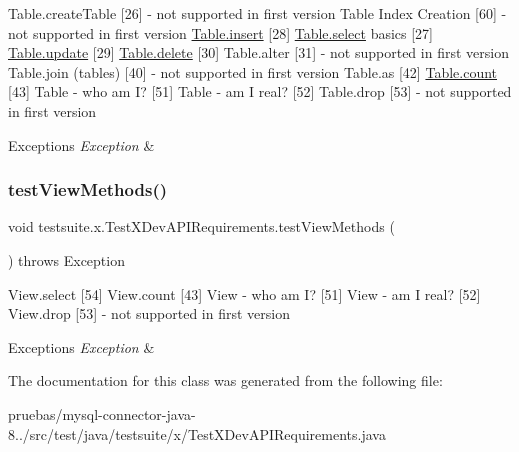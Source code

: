 Table.\+create\+Table \mbox{[}26\mbox{]} -\/ not supported in first version Table Index Creation \mbox{[}60\mbox{]} -\/ not supported in first version \mbox{\hyperlink{interfacecom_1_1mysql_1_1cj_1_1xdevapi_1_1_table_ae9faedd85539146509fa68982fc346f9}{Table.\+insert}} \mbox{[}28\mbox{]} \mbox{\hyperlink{interfacecom_1_1mysql_1_1cj_1_1xdevapi_1_1_table_a36559f114d9638a63d8743f1f1630017}{Table.\+select}} basics \mbox{[}27\mbox{]} \mbox{\hyperlink{interfacecom_1_1mysql_1_1cj_1_1xdevapi_1_1_table_a941215cefeb7236388db7d0390621a17}{Table.\+update}} \mbox{[}29\mbox{]} \mbox{\hyperlink{interfacecom_1_1mysql_1_1cj_1_1xdevapi_1_1_table_a52be4284a88e0a4f243580be570018e2}{Table.\+delete}} \mbox{[}30\mbox{]} Table.\+alter \mbox{[}31\mbox{]} -\/ not supported in first version Table.\+join (tables) \mbox{[}40\mbox{]} -\/ not supported in first version Table.\+as \mbox{[}42\mbox{]} \mbox{\hyperlink{interfacecom_1_1mysql_1_1cj_1_1xdevapi_1_1_table_a4f0524bd76d54d6b053187ea09ab2956}{Table.\+count}} \mbox{[}43\mbox{]} Table -\/ who am I? \mbox{[}51\mbox{]} Table -\/ am I real? \mbox{[}52\mbox{]} Table.\+drop \mbox{[}53\mbox{]} -\/ not supported in first version


\begin{DoxyExceptions}{Exceptions}
{\em Exception} & \\
\hline
\end{DoxyExceptions}
\mbox{\label{classtestsuite_1_1x_1_1_test_x_dev_a_p_i_requirements_abe35866f814afea6ea1f17133b93d9de}} 
\subsubsection{\texorpdfstring{test\+View\+Methods()}{testViewMethods()}}
{\footnotesize\ttfamily void testsuite.\+x.\+Test\+X\+Dev\+A\+P\+I\+Requirements.\+test\+View\+Methods (\begin{DoxyParamCaption}{ }\end{DoxyParamCaption}) throws Exception}

View.\+select \mbox{[}54\mbox{]} View.\+count \mbox{[}43\mbox{]} View -\/ who am I? \mbox{[}51\mbox{]} View -\/ am I real? \mbox{[}52\mbox{]} View.\+drop \mbox{[}53\mbox{]} -\/ not supported in first version


\begin{DoxyExceptions}{Exceptions}
{\em Exception} & \\
\hline
\end{DoxyExceptions}


The documentation for this class was generated from the following file\+:\begin{DoxyCompactItemize}
\item 
pruebas/mysql-\/connector-\/java-\/8../src/test/java/testsuite/x/Test\+X\+Dev\+A\+P\+I\+Requirements.\+java\end{DoxyCompactItemize}

